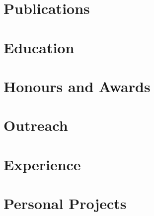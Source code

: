 \documentclass[english,a4paper,10pt]{extarticle}
\begin{document}
\def\role{} %

\pagestyle{normal_page}
\thispagestyle{first_page}

% 

\section{Publications}


\section{Education}


\section{Honours and Awards}


\section{Outreach}


% 

\section{Experience}


\section{Personal Projects}



\thispagestyle{last_page}

\end{document}
